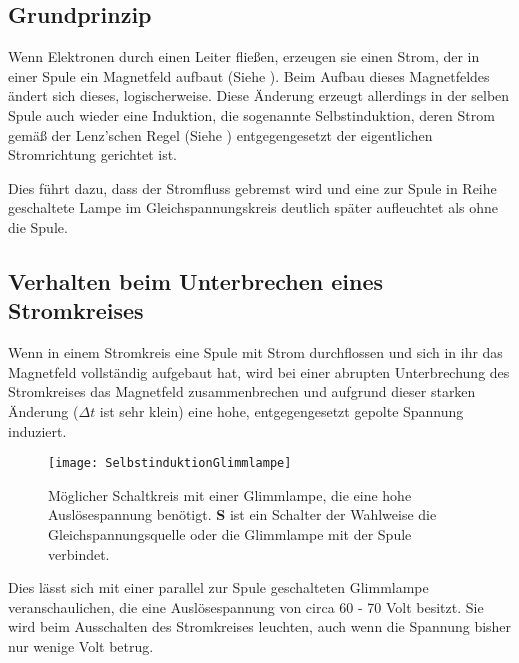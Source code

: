 \subsection{Grundprinzip}

Wenn Elektronen durch einen Leiter fließen, erzeugen sie einen Strom, der in einer Spule ein Magnetfeld aufbaut (Siehe ). Beim Aufbau dieses Magnetfeldes ändert sich dieses, logischerweise. Diese Änderung erzeugt allerdings in der selben Spule auch wieder eine Induktion, die sogenannte Selbstinduktion, deren Strom gemäß der Lenz'schen Regel (Siehe ) entgegengesetzt der eigentlichen Stromrichtung gerichtet ist.

Dies führt dazu, dass der Stromfluss \glqq gebremst\grqq{} wird und eine zur Spule in Reihe geschaltete Lampe im Gleichspannungskreis deutlich später aufleuchtet als ohne die Spule.

\subsection{Verhalten beim Unterbrechen eines Stromkreises}

Wenn in einem Stromkreis eine Spule mit Strom durchflossen und sich in ihr das Magnetfeld vollständig aufgebaut hat, wird bei einer abrupten Unterbrechung des Stromkreises das Magnetfeld zusammenbrechen und aufgrund dieser starken Änderung ($\Delta t$ ist sehr klein) eine hohe, entgegengesetzt gepolte Spannung induziert.

\begin{figure}
	\texttt{[image: SelbstinduktionGlimmlampe]}
	\caption{Möglicher Schaltkreis mit einer Glimmlampe, die eine hohe Auslösespannung benötigt. \textbf{S} ist ein Schalter der Wahlweise die Gleichspannungsquelle oder die Glimmlampe mit der Spule verbindet.}
	\label{fig:SchaltkreisGlimmlampe}
\end{figure}

Dies lässt sich mit einer parallel zur Spule geschalteten Glimmlampe veranschaulichen, die eine Auslösespannung von circa 60 - 70 Volt besitzt. Sie wird beim Ausschalten des Stromkreises leuchten, auch wenn die Spannung bisher nur wenige Volt betrug.